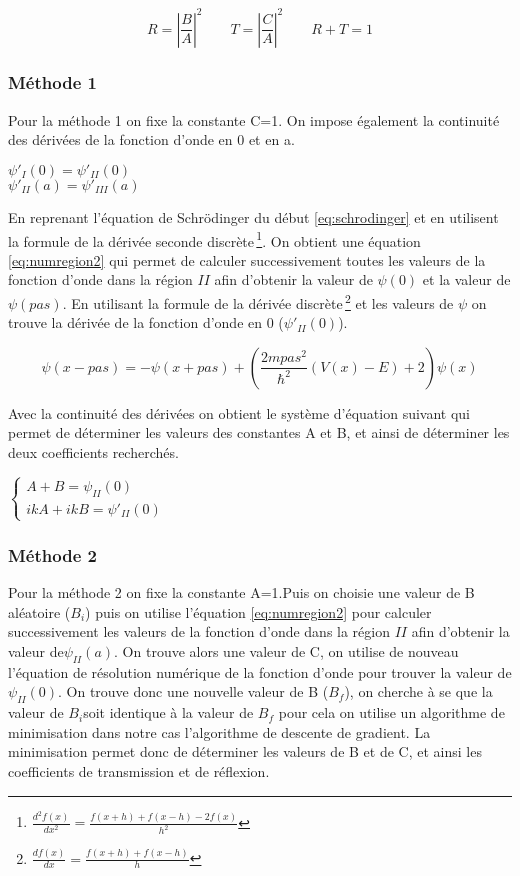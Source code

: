 \begin{equation} \label{eq:defcoeff}
R=|\frac{B}{A}|^{2}\qquad T=|\frac{C}{A}|^{2}\qquad R+T=1
\end{equation}
\subsubsection{Méthode 1}

Pour la méthode 1 on fixe la constante C=1. On impose également la continuité des dérivées de la fonction d'onde en 0 et en a.
\begin{center}
$\psi'_{I}(0)=\psi'_{II}(0)$\\
$\psi'_{II}(a)=\psi'_{III}(a)$
\end{center}
En reprenant l'équation de Schrödinger du début \ref{eq:schrodinger} et en utilisent la formule de la dérivée seconde discrète\,\footnote{$\frac{d^{2}f(x)}{dx^{2}}=\frac{f(x+h)+f(x-h)-2f(x)}{h^{2}}$}. On obtient une équation \ref{eq:numregion2} qui permet de calculer successivement toutes les valeurs de la fonction d'onde dans la région $II$ afin d'obtenir la valeur de $\psi(0)$ et  la valeur de $\psi(pas)$. En utilisant la formule de la dérivée discrète\,\footnote{$\frac{df(x)}{dx}=\frac{f(x+h)+f(x-h)}{h}$} et les valeurs de $\psi$ on trouve la dérivée de la fonction d'onde en 0 ($\psi'_{II}(0)$).

\begin{equation} \label{eq:numregion2}
\psi(x-pas)=-\psi(x+pas)+(\frac{2mpas^{2}}{\hbar^{2}}(V(x)-E)+2)\psi(x)
\end{equation}

Avec la continuité des dérivées on obtient le système d'équation suivant qui permet de déterminer les valeurs des constantes A et B, et ainsi de déterminer les deux coefficients recherchés.
\begin{center}
$ \left\{
    \begin{array}{ll}
       A+B= \psi_{II}(0) \\
       ikA+ikB=\psi'_{II}(0) 
    \end{array}
\right.$
\end{center}
\subsubsection{Méthode 2}
Pour la méthode 2 on fixe la constante A=1.Puis on choisie une valeur de B aléatoire ($B_{i}$) puis on utilise l'équation  \ref{eq:numregion2} pour calculer successivement les valeurs de la fonction d'onde dans la région $II$ afin d'obtenir la valeur de$\psi_{II}(a)$. On trouve alors une valeur de C, on utilise de nouveau l'équation de résolution numérique de la fonction d'onde pour trouver la valeur de $\psi_{II}(0)$. On trouve donc une nouvelle valeur de B ($B_{f}$), on cherche à se que la valeur de $B_{i}$soit identique à la valeur de $B_{f}$ pour cela on utilise un algorithme de minimisation dans notre cas l'algorithme de descente de gradient. La minimisation permet donc de déterminer les valeurs de B et de C, et ainsi les coefficients de transmission et de réflexion.

